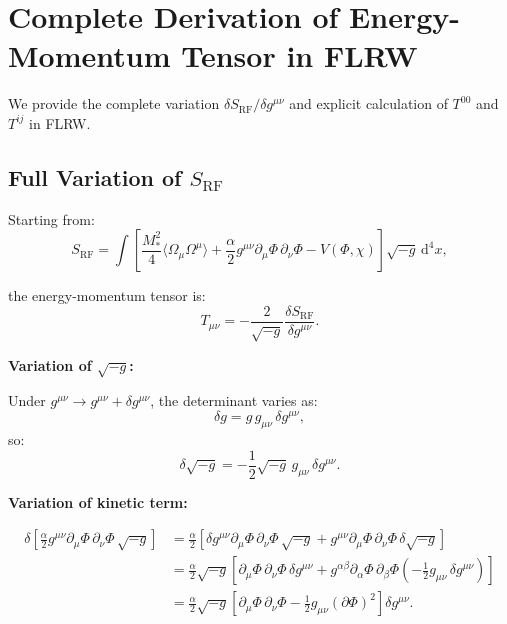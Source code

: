 \documentclass[11pt,a4paper]{article}
\numberwithin{equation}{section}
\theoremstyle{plain}
\theoremstyle{definition}
\theoremstyle{remark}
\newcommand{\dd}{\mathrm{d}}
\begin{document}
\section{Complete Derivation of Energy-Momentum Tensor in FLRW}
\label{app:stress}

We provide the complete variation $\delta S_{\mathrm{RF}}/\delta g^{\mu\nu}$ and explicit calculation of $T^{00}$ and $T^{ij}$ in FLRW.

\subsection{Full Variation of $S_{\mathrm{RF}}$}

Starting from:
\begin{equation}
S_{\mathrm{RF}} = \int \left[\frac{M_*^2}{4}\langle \Omega_\mu \Omega^\mu \rangle + \frac{\alpha}{2}g^{\mu\nu}\partial_\mu\Phi\,\partial_\nu\Phi - V(\Phi,\chi)\right] \sqrt{-g}\, \dd^4x,
\end{equation}

the energy-momentum tensor is:
\begin{equation}
T_{\mu\nu} = -\frac{2}{\sqrt{-g}}\frac{\delta S_{\mathrm{RF}}}{\delta g^{\mu\nu}}.
\end{equation}

\textbf{Variation of $\sqrt{-g}$:}

Under $g^{\mu\nu} \to g^{\mu\nu} + \delta g^{\mu\nu}$, the determinant varies as:
\begin{equation}
\delta g = g\,g_{\mu\nu}\,\delta g^{\mu\nu},
\end{equation}
so:
\begin{equation}
\delta\sqrt{-g} = -\frac{1}{2}\sqrt{-g}\,g_{\mu\nu}\,\delta g^{\mu\nu}.
\end{equation}

\textbf{Variation of kinetic term:}

\begin{align}
\delta\left[\frac{\alpha}{2}g^{\mu\nu}\partial_\mu\Phi\,\partial_\nu\Phi\,\sqrt{-g}\right] &= \frac{\alpha}{2}\left[\delta g^{\mu\nu}\partial_\mu\Phi\,\partial_\nu\Phi\,\sqrt{-g} + g^{\mu\nu}\partial_\mu\Phi\,\partial_\nu\Phi\,\delta\sqrt{-g}\right]\\
&= \frac{\alpha}{2}\sqrt{-g}\left[\partial_\mu\Phi\,\partial_\nu\Phi\,\delta g^{\mu\nu} + g^{\alpha\beta}\partial_\alpha\Phi\,\partial_\beta\Phi\left(-\frac{1}{2}g_{\mu\nu}\,\delta g^{\mu\nu}\right)\right]\\
&= \frac{\alpha}{2}\sqrt{-g}\left[\partial_\mu\Phi\,\partial_\nu\Phi - \frac{1}{2}g_{\mu\nu}(\partial\Phi)^2\right]\delta g^{\mu\nu}.
\end{align}
\end{document}
